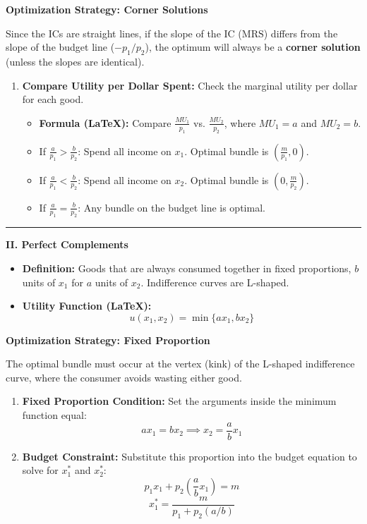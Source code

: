 \documentclass{article}
\begin{document}
\noindent\textbf{Optimization Strategy: Corner Solutions}

Since the ICs are straight lines, if the slope of the IC ($\text{MRS}$) differs from the slope of the budget line ($-p_1/p_2$), the optimum will always be a \textbf{corner solution} (unless the slopes are identical).

\begin{enumerate}
    \item \textbf{Compare Utility per Dollar Spent:} Check the marginal utility per dollar for each good.
    \begin{itemize}
        \item \textbf{Formula (LaTeX):} Compare $\frac{MU_1}{p_1}$ vs. $\frac{MU_2}{p_2}$, where $MU_1=a$ and $MU_2=b$.
        \item If $\frac{a}{p_1} > \frac{b}{p_2}$: Spend all income on $x_1$. Optimal bundle is $\left(\frac{m}{p_1}, 0\right)$.
        \item If $\frac{a}{p_1} < \frac{b}{p_2}$: Spend all income on $x_2$. Optimal bundle is $\left(0, \frac{m}{p_2}\right)$.
        \item If $\frac{a}{p_1} = \frac{b}{p_2}$: Any bundle on the budget line is optimal.
    \end{itemize}
\end{enumerate}

\medskip\noindent\rule{\linewidth}{0.4pt}\medskip

\noindent\textbf{II. Perfect Complements}
\begin{itemize}
    \item \textbf{Definition:} Goods that are always consumed together in fixed proportions, $b$ units of $x_1$ for $a$ units of $x_2$. Indifference curves are L-shaped.
    \item \textbf{Utility Function (LaTeX):} \[u(x_1, x_2) = \min\{a x_1, b x_2\}\]
\end{itemize}

\noindent\textbf{Optimization Strategy: Fixed Proportion}

The optimal bundle must occur at the vertex (kink) of the L-shaped indifference curve, where the consumer avoids wasting either good.

\begin{enumerate}
    \item \textbf{Fixed Proportion Condition:} Set the arguments inside the minimum function equal: \[a x_1 = b x_2 \implies x_2 = \frac{a}{b} x_1\]
    \item \textbf{Budget Constraint:} Substitute this proportion into the budget equation to solve for $x_1^*$ and $x_2^*$: \[p_1 x_1 + p_2 \left(\frac{a}{b} x_1\right) = m\] \[x_1^* = \frac{m}{p_1 + p_2(a/b)}\]
\end{enumerate}
\end{document}
